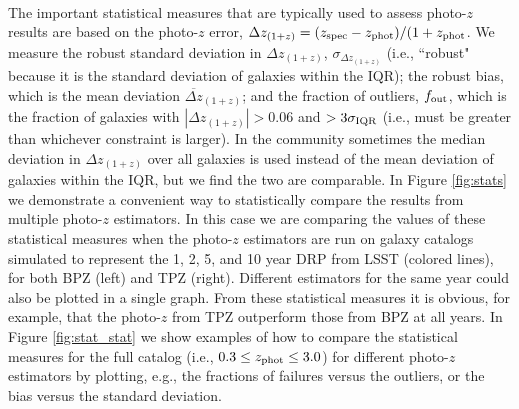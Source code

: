 \documentclass[DM,lsstdraft,toc]{lsstdoc}
\begin{document}
\smallskip {} \\
The important statistical measures that are typically used to assess photo-$z$ results are based on the photo-$z$ error, $\Delta z_{(1+z)} = (z_{\rm spec}-z_{\rm phot})/(1+z_{\rm phot}$. We measure the robust standard deviation in $\Delta z_{(1+z)}$, $\sigma_{\Delta z_{(1+z)}}$ (i.e., ``robust" because it is the standard deviation of galaxies within the IQR); the robust bias, which is the mean deviation $\overline{\Delta z}_{(1+z)}$; and the fraction of outliers, $f_{\rm out}$, which is the fraction of galaxies with $|\Delta z_{(1+z)}|> 0.06$ and $>3\sigma_{\rm IQR}$ (i.e., must be greater than whichever constraint is larger). In the community sometimes the median deviation in $\Delta z_{(1+z)}$ over all galaxies is used instead of the mean deviation of galaxies within the IQR, but we find the two are comparable. In Figure \ref{fig:stats} we demonstrate a convenient way to statistically compare the results from multiple photo-$z$ estimators. In this case we are comparing the values of these statistical measures when the photo-$z$ estimators are run on galaxy catalogs simulated to represent the 1, 2, 5, and 10 year DRP from LSST (colored lines), for both BPZ (left) and TPZ (right). Different estimators for the same year could also be plotted in a single graph. From these statistical measures it is obvious, for example, that the photo-$z$ from TPZ outperform those from BPZ at all years. In Figure \ref{fig:stat_stat} we show examples of how to compare the statistical measures for the full catalog (i.e., $0.3 \leq z_{\rm phot} \leq 3.0$) for different photo-$z$ estimators by plotting, e.g., the fractions of failures versus the outliers, or the bias versus the standard deviation.
\end{document}
